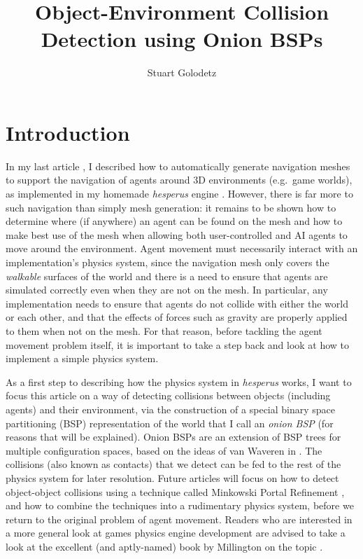 \documentclass[10pt,twocolumn]{article}
\begin{document}
\title{Object-Environment Collision Detection using Onion BSPs}
\author{Stuart Golodetz}
\date{}
\maketitle

\section{Introduction}

In my last article \cite{golodetzoverload13oct}, I described how to automatically generate navigation meshes to support the navigation of agents around 3D environments (e.g.~game worlds), as implemented in my homemade \emph{hesperus} engine \cite{hesperus}. However, there is far more to such navigation than simply mesh generation: it remains to be shown how to determine where (if anywhere) an agent can be found on the mesh and how to make best use of the mesh when allowing both user-controlled and AI agents to move around the environment. Agent movement must necessarily interact with an implementation's physics system, since the navigation mesh only covers the \emph{walkable} surfaces of the world and there is a need to ensure that agents are simulated correctly even when they are not on the mesh. In particular, any implementation needs to ensure that agents do not collide with either the world or each other, and that the effects of forces such as gravity are properly applied to them when not on the mesh. For that reason, before tackling the agent movement problem itself, it is important to take a step back and look at how to implement a simple physics system.

As a first step to describing how the physics system in \emph{hesperus} works, I want to focus this article on a way of detecting collisions between objects (including agents) and their environment, via the construction of a special binary space partitioning (BSP) representation of the world that I call an \emph{onion BSP} (for reasons that will be explained). Onion BSPs are an extension of BSP trees for multiple configuration spaces, based on the ideas of van Waveren in \cite{vanwaveren01}. The collisions (also known as contacts) that we detect can be fed to the rest of the physics system for later resolution. Future articles will focus on how to detect object-object collisions using a technique called Minkowski Portal Refinement \cite{snethen08}, and how to combine the techniques into a rudimentary physics system, before we return to the original problem of agent movement. Readers who are interested in a more general look at games physics engine development are advised to take a look at the excellent (and aptly-named) book by Millington on the topic \cite{millington07}.
\end{document}
